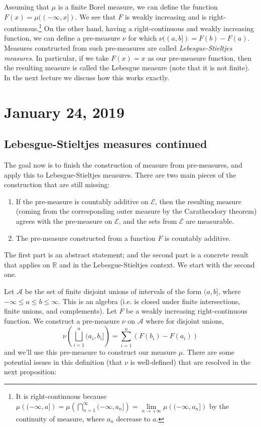 \documentclass{article}
\theoremstyle{definition}
\begin{document}
Assuming that \(\mu\) is a finite Borel measure, we can
define the function
\( F(x) = \mu((- \infty, x]) \). We see that \( F \) is
weakly increasing and is right-continuous.\footnote{It is right-continuous 
	because $\mu\left( (-\infty,a] \right)=\mu\left( \bigcap_{n=1}^{\infty}(-\infty,a_n] \right)=
\lim\limits_{n\to+\infty}\mu\left( (-\infty,a_n] \right)$
by the continuity of measure, where $a_n$ decrease to $a$.}
On the other hand, 
having a right-continuous and weakly increasing function,
we can define a pre-measure $\nu$ for which
$\nu((a,b])=F(b)-F(a)$.
Measures constructed from such pre-measures are called
\emph{Lebesgue-Stieltjes measures}. 
In particular, if we take \( F(x) = x \) as our
pre-measure function, then the resulting measure is called the Lebesgue
measure (note that it is not finite).
In the next lecture we discuss how this works exactly.

\section{January 24, 2019}

\subsection{Lebesgue-Stieltjes measures continued}

The goal now is to finish the construction of measure
from pre-measures, and apply this to Lebesgue-Stieltjes measures.
There are two main pieces of the construction that are still missing:
\begin{enumerate}
	\item If the pre-measure is countably additive on $\mathcal{E}$, then the
		resulting measure (coming from the corresponding outer measure by the Caratheodory theorem)
		agrees with the pre-measure on $\mathcal{E}$, and the sets from $\mathcal{E}$ are
		measurable.
	\item The pre-measure constructed from a function $F$ is countably additive.
\end{enumerate}
The first part is an abstract statement; and the second part is a 
concrete result that applies on $\mathbb{R}$ and in the Lebesgue-Stieltjes context.
We start with the second one.

Let \( \mathcal{A} \) be the set of finite disjoint unions of intervals of the form \(
(a,b] \), where $-\infty\le a\le b\le \infty$. 
This is an algebra (i.e. is closed under finite intersections,
finite unions, and complements). 
Let $F$ be a weakly increasing right-continuous function.
We construct a pre-measure \(\nu\) on \(
\mathcal{A} \) where for disjoint unions, 
\begin{displaymath}
    \nu\left(\bigsqcup_{i = 1}^{n} (a_{i}, b_{i}]\right) 
		=
		\sum_{i = 1}^{n} (F(b_{i}) - F(a_{i}))
\end{displaymath}
and we'll use this pre-measure to construct our measure \(\mu\).
There are some potential issues in this definition (that $\nu$ is well-defined)
that are resolved in the next proposition:
\end{document}
